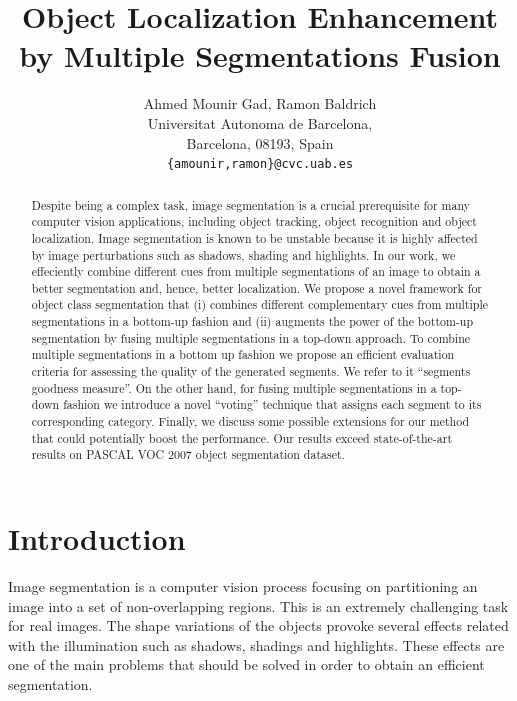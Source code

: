 \documentclass[10pt,twocolumn,letterpaper]{article}
\begin{document}
\title{Object Localization Enhancement by Multiple Segmentations Fusion}

\author{Ahmed Mounir Gad, Ramon Baldrich\\
Universitat Autonoma de Barcelona,\\
Barcelona, 08193, Spain\\
{\tt\small \{amounir,ramon\}@cvc.uab.es}
}

\maketitle

\begin{abstract}

Despite being a complex task, image segmentation is a crucial prerequisite for many computer vision applications,
including object tracking, object recognition and object localization.
Image segmentation is known to be unstable because it is highly affected by image perturbations such as shadows, shading and highlights.
In our work, we effeciently combine different cues from multiple segmentations of an image to obtain a better segmentation and, hence, better localization.
We propose a novel framework for object class segmentation that
(i) combines different complementary cues from multiple segmentations in a bottom-up fashion
and
(ii) augments the power of the bottom-up segmentation by fusing multiple segmentations in a top-down approach.
To combine multiple segmentations in a bottom up fashion we propose an efficient evaluation criteria for assessing the quality of the generated segments.
We refer to it ``segments goodness measure''.
On the other hand, for fusing multiple segmentations in a top-down fashion we introduce a novel ``voting'' technique  that assigns each segment to its corresponding category.
Finally, we discuss some possible extensions for our method that could potentially boost the performance.
Our results exceed state-of-the-art results on PASCAL VOC 2007 object segmentation dataset.

\end{abstract}

\section{Introduction}

Image segmentation is a computer vision process focusing on
partitioning an image into a set of non-overlapping regions. This is
an extremely challenging task for real images. The shape variations of
the objects provoke several effects related with the illumination such
as shadows, shadings and highlights. These effects are one of the main
problems that should be solved in order to obtain an efficient
segmentation.
\end{document}

